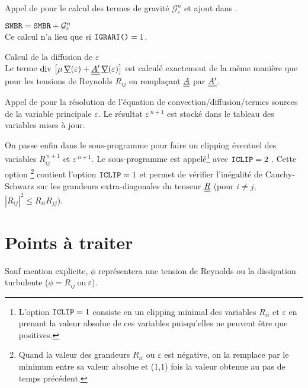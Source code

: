 \begin{itemize}
{\item Appel de  pour le calcul des termes de gravité $\mathcal{G}^n_{\varepsilon}$ et ajout dans .

$ \text{\texttt{SMBR}} = \text{\texttt{SMBR}} + \mathcal{G}^n_{\varepsilon}$\\
Ce calcul n'a lieu que si $\text{\texttt{IGRARI()}} = 1$.

\item Calcul de la diffusion de $\varepsilon$ \\
 Le terme $\text{div}\, \left[\mu\, \underline{\nabla}(\varepsilon) + \underline{\underline{A'}}\,\underline{\nabla}(\varepsilon)
\right]$ est calculé exactement de la même manière que pour les tensions
de Reynolds $R_{ij}$ en remplaçant $\underline{\underline{A}}$ par $\underline{\underline{A'}}$.

\item Appel de  pour la résolution de l'équation de
convection/diffusion/termes sources de la variable principale $\varepsilon$. Le
résultat $\varepsilon^{\,n+1}$ est stocké dans le tableau  des
variables mises à jour.
}
\end{itemize}

On passe enfin dans le sous-programme   pour faire un clipping éventuel
des variables $R^{\,n+1}_{ij}$ et $\varepsilon^{\,n+1}$. Le sous-programme
 est appelé\footnote{L'option
$\text{\texttt{ICLIP}} = 1$ consiste en un clipping minimal des variables $R_{ii}$ et
$\varepsilon$ en prenant la valeur absolue de ces variables puisqu'elles ne
peuvent être que positives.} avec $\text{\texttt{ICLIP}} = 2$ . Cette option
\footnote{Quand la valeur des grandeurs $R_{ii}$ ou $\varepsilon$ est
négative, on la remplace par le minimum entre sa valeur absolue et (1,1)
fois la valeur obtenue au pas de temps précédent.} contient l'option $\text{\texttt{ICLIP}} = 1$  et permet de vérifier l'inégalité de Cauchy-Schwarz sur les grandeurs extra-diagonales du tenseur $\underline{\underline{R}}$ (pour $i \neq j$, $|R_{ij}|^2 \le R_{ii} R_{jj}$).


\section*{Points à traiter}
Sauf mention explicite, $\phi$ représentera une tension de Reynolds ou la dissipation turbulente ($\phi = R_{ij} \ \text{ou} \ \varepsilon$).

